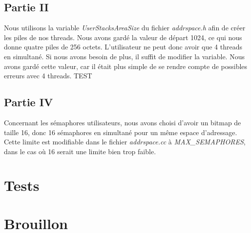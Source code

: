 \documentclass{article}
\begin{document}
\subsection{Partie II}
Nous utilisons la variable \textit{UserStacksAreaSize} du fichier
\textit{addrspace.h} afin de créer les piles de nos threads. Nous avons gardé
la valeur de départ 1024, ce qui nous donne quatre piles de 256 octets.
L'utilisateur ne peut donc avoir que 4 threads en simultané. Si nous avons
besoin de plus, il suffit de modifier la variable. Nous avons gardé cette
valeur, car il était plus simple de se rendre compte de possibles erreurs avec
4 threads. TEST

\subsection{Partie IV}
Concernant les sémaphores utilisateurs, nous avons choisi d'avoir un bitmap de
taille 16, donc 16 sémaphores en simultané pour un même espace d'adressage.
Cette limite est modifiable dans le fichier \textit{addrspace.cc} à
\textit{MAX\_SEMAPHORES}, dans le cas où 16 serait une limite bien trop faible.

\section{Tests}

\section{Brouillon}
\end{document}
